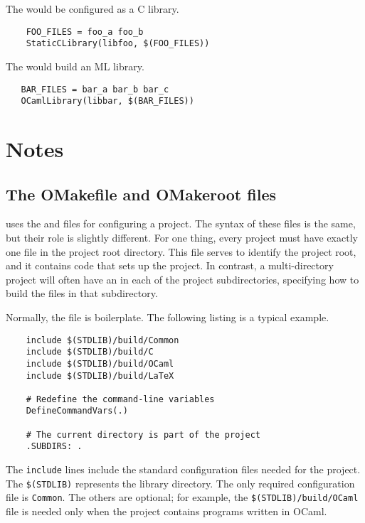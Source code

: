 The  would be configured as a C library.

\begin{verbatim}
    FOO_FILES = foo_a foo_b
    StaticCLibrary(libfoo, $(FOO_FILES))
\end{verbatim}

The  would build an ML library.

\begin{verbatim}
   BAR_FILES = bar_a bar_b bar_c
   OCamlLibrary(libbar, $(BAR_FILES))
\end{verbatim}

\section{Notes}

\subsection{The OMakefile and OMakeroot files}

 uses the  and  files for configuring a project.  The
syntax of these files is the same, but their role is slightly different.  For one thing, every
project must have exactly one  file in the project root directory.  This file serves
to identify the project root, and it contains code that sets up the project.  In contrast, a
multi-directory project will often have an  in each of the project subdirectories,
specifying how to build the files in that subdirectory.

Normally, the  file is boilerplate.  The following listing is a typical example.

\begin{verbatim}
    include $(STDLIB)/build/Common
    include $(STDLIB)/build/C
    include $(STDLIB)/build/OCaml
    include $(STDLIB)/build/LaTeX

    # Redefine the command-line variables
    DefineCommandVars(.)

    # The current directory is part of the project
    .SUBDIRS: .
\end{verbatim}

The \verb+include+ lines include the standard configuration files needed for the project.  The
\verb+$(STDLIB)+ represents the  library directory.  The only required configuration
file is \verb+Common+.  The others are optional; for example, the \verb+$(STDLIB)/build/OCaml+ file
is needed only when the project contains programs written in OCaml.

